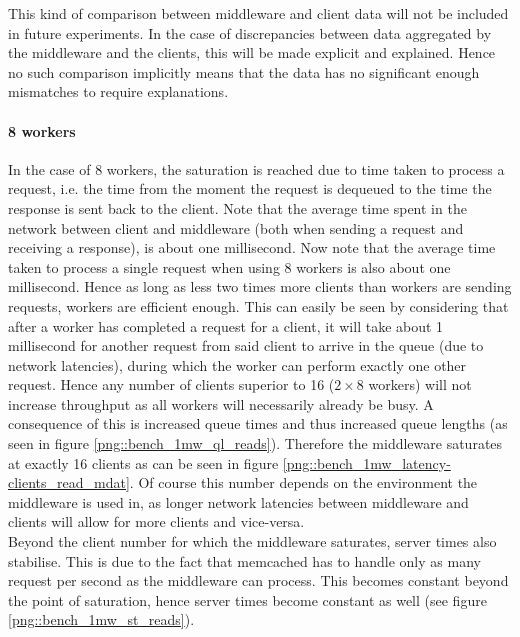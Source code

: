 \documentclass[11pt,a4paper]{article}
\begin{document}
This kind of comparison between middleware and client data will not be included in future experiments. In the case of discrepancies between data aggregated by the middleware and the clients, this will be made explicit and explained. Hence no such comparison implicitly means that the data has no significant enough mismatches to require explanations.

\paragraph{8 workers}
In the case of 8 workers, the saturation is reached due to time taken to process a request, i.e. the time from the moment the request is dequeued to the time the response is sent back to the client. Note that the average time spent in the network between client and middleware (both when sending a request and receiving a response), is about one millisecond. Now note that the average time taken to process a single request when using 8 workers is also about one millisecond. Hence as long as less two times more clients than workers are sending requests, workers are efficient enough. This can easily be seen by considering that after a worker has completed a request for a client, it will take about 1 millisecond for another request from said client to arrive in the queue (due to network latencies), during which the worker can perform exactly one other request. Hence any number of clients superior to 16 ($2\times8$ workers) will not increase throughput as all workers will necessarily already be busy. A consequence of this is increased queue times and thus increased queue lengths (as seen in figure \ref{png::bench_1mw_ql_reads}). Therefore the middleware saturates at exactly 16 clients as can be seen in figure \ref{png::bench_1mw_latency-clients_read_mdat}. Of course this number depends on the environment the middleware is used in, as longer network latencies between middleware and clients will allow for more clients and vice-versa.\\
Beyond the client number for which the middleware saturates, server times also stabilise. This is due to the fact that memcached has to handle only as many request per second as the middleware can process. This becomes constant beyond the point of saturation, hence server times become constant as well (see figure \ref{png::bench_1mw_st_reads}).
\end{document}
